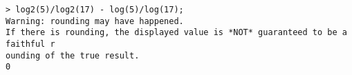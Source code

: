 \begin{center}\begin{minipage}{15cm}\begin{Verbatim}[frame=single]
> log2(5)/log2(17) - log(5)/log(17);
Warning: rounding may have happened.
If there is rounding, the displayed value is *NOT* guaranteed to be a faithful r
ounding of the true result.
0
\end{Verbatim}
\end{minipage}\end{center}
